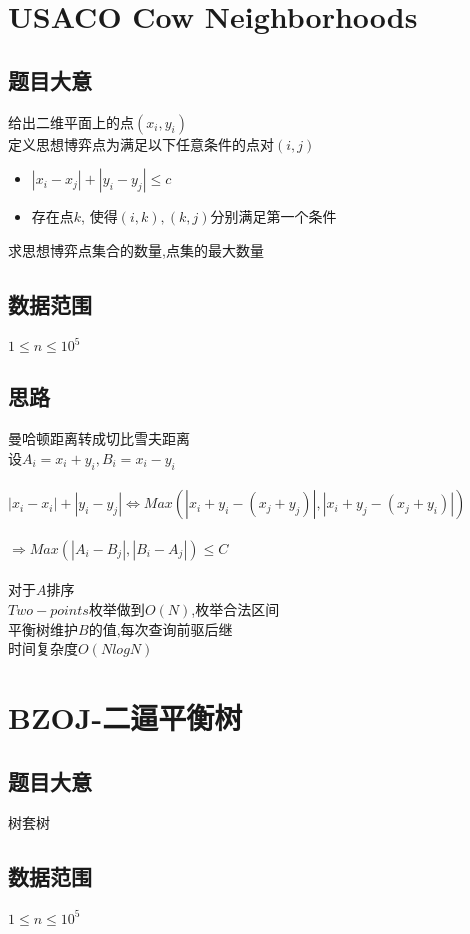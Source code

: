 \documentclass{ctexart}
\numberwithin{equation}{section}
\begin{document}
\begin{flushleft}
  \section{USACO Cow Neighborhoods}
  \subsection{题目大意}
  给出二维平面上的点$(x_i,y_i)$\\
  定义思想博弈点为满足以下任意条件的点对$(i,j)$\\
  \begin{itemize}
  \item $|x_i-x_j|+|y_i-y_j|\le c$
  \item 存在点$k$, 使得$(i,k),(k,j)$分别满足第一个条件
  \end{itemize}
  求思想博弈点集合的数量,点集的最大数量\\
  \subsection{数据范围}
  $1\le n\le 10^5$\\
  \subsection{思路}
  曼哈顿距离转成切比雪夫距离\\
  设$A_i = x_i+y_i, B_i = x_i-y_i$\\
  ~\\
  $|x_i-x_i|+|y_i-y_j| \Leftrightarrow Max(|x_i+y_i-(x_j+y_j)|, |x_i+y_j-(x_j+y_i)|)$\\
  ~\\
  $\Rightarrow Max(|A_i-B_j|, |B_i-A_j|) \le C$\\
  ~\\

  对于$A$排序\\
  $Two-points$枚举做到$O(N)$,枚举合法区间\\
  平衡树维护$B$的值,每次查询前驱后继\\
  时间复杂度$O(NlogN)$\\
  \newpage

  \section{BZOJ-二逼平衡树}
  \subsection{题目大意}
  树套树
  \subsection{数据范围}
  $1\le n\le 10^5$\\

\end{flushleft}
\end{document}
